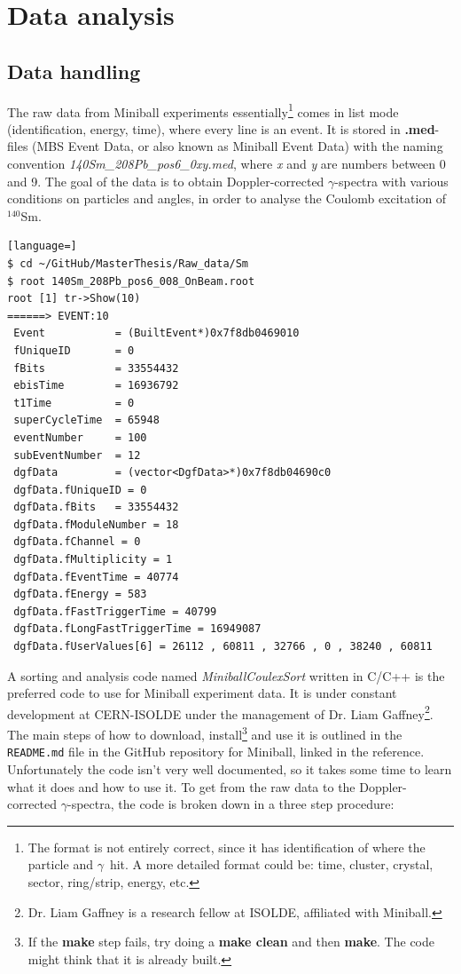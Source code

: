 \documentclass[twoside,english]{uiofysmaster/uiofysmaster}
\newcommand{\Sm}{$^{140}$Sm} %
\newcommand{\ga}{$\gamma$}
\begin{document}


\chapter{Data analysis}  

\section{Data handling}
The raw data from Miniball experiments essentially\footnote{The format is not entirely correct, since it has identification of where the particle and \ga\ hit. A more detailed format could be: time, cluster, crystal, sector, ring/strip, energy, etc.} comes in list mode (identification, energy, time), where every line is an event. It is stored in \textbf{.med}-files (MBS Event Data, or also known as Miniball Event Data) with the naming convention \textit{140Sm\_208Pb\_pos6\_0xy.med}, where \textit{x} and \textit{y} are numbers between 0 and 9. The goal of the data is to obtain Doppler-corrected \ga-spectra with various conditions on particles and angles, in order to analyse the Coulomb excitation of \Sm. 

\begin{lstlisting}[language=]
$ cd ~/GitHub/MasterThesis/Raw_data/Sm
$ root 140Sm_208Pb_pos6_008_OnBeam.root
root [1] tr->Show(10)
======> EVENT:10
 Event           = (BuiltEvent*)0x7f8db0469010
 fUniqueID       = 0
 fBits           = 33554432
 ebisTime        = 16936792
 t1Time          = 0
 superCycleTime  = 65948
 eventNumber     = 100
 subEventNumber  = 12
 dgfData         = (vector<DgfData>*)0x7f8db04690c0
 dgfData.fUniqueID = 0
 dgfData.fBits   = 33554432
 dgfData.fModuleNumber = 18
 dgfData.fChannel = 0
 dgfData.fMultiplicity = 1
 dgfData.fEventTime = 40774
 dgfData.fEnergy = 583
 dgfData.fFastTriggerTime = 40799
 dgfData.fLongFastTriggerTime = 16949087
 dgfData.fUserValues[6] = 26112 , 60811 , 32766 , 0 , 38240 , 60811
\end{lstlisting}

A sorting and analysis code named \textsl{MiniballCoulexSort} \cite{MBCS} written in C/C++ is the preferred code to use for Miniball experiment data. 
It is under constant development at CERN-ISOLDE under the management of Dr. Liam Gaffney\footnote{Dr. Liam Gaffney is a research fellow at ISOLDE, affiliated with Miniball.}. The main steps of how to download, install\footnote{If the \textbf{make} step fails, try doing a \textbf{make clean} and then \textbf{make}. The code might think that it is already built.} and use it is outlined in the \texttt{README.md} file in the GitHub repository for Miniball, linked in the reference. Unfortunately the code isn't very well documented, so it takes some time to learn what it does and how to use it. To get from the raw data to the Doppler-corrected \ga-spectra, the code is broken down in a three step procedure:
\end{document}
